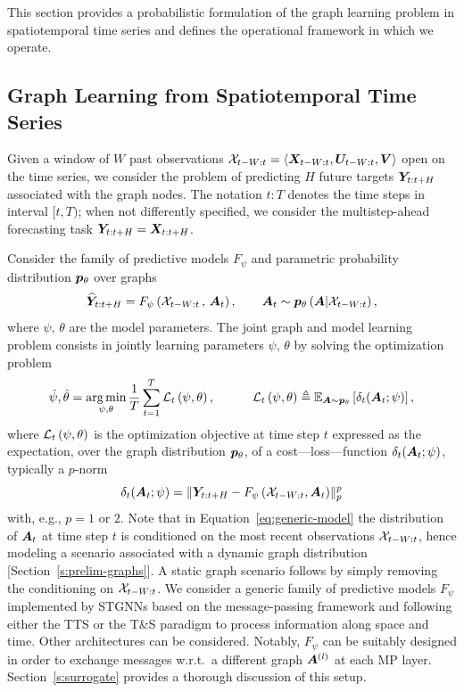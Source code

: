 This section provides a probabilistic formulation of the graph learning problem in spatiotemporal time series and defines the operational framework in which we operate. 

\subsection{Graph Learning from Spatiotemporal Time Series} 
Given a window of $W$ past observations ${{\mathcal{X}}_{t-W:t} = {\left\langle {\bm{X}}_{t-W:t}, {\bm{U}}_{t-W:t}, {\bm{V}} \right\rangle}}$ open on the time series, we consider the problem of predicting $H$ future targets ${\bm{Y}}_{t:t+H}$ associated with the graph nodes. The notation $t:T$ denotes the time steps in interval $[t,T)$; when not differently specified, we consider the multistep-ahead forecasting task ${\bm{Y}}_{t:t+H} = {\bm{X}}_{t:t+H}$.  

Consider the family of predictive models $F_\psi$ and parametric probability distribution ${{\bm{p}}_\theta}$ over graphs
\begin{equation}\label{eq:generic-model}
    \widehat {{\bm{Y}}}_{t: t + H} = F_\psi\left({\mathcal{X}}_{t-W:t}\,,\,  {\bm{A}}_t \right), \quad\quad {\bm{A}}_t \sim {{\bm{p}}_\theta}\left({\bm{A}} \vert {\mathcal{X}}_{t-W:t} \right),
\end{equation}
where $\psi$, $\theta$ are the model parameters. The joint graph and model learning problem consists in jointly learning parameters $\psi$, $\theta$ by solving the optimization problem
\begin{equation}\label{eq:generic-losses}
\hat \psi,\hat \theta = \operatorname*{arg\,min}_{\psi,\theta}\frac{1}{T}\sum_{t=1}^{T}\mathcal{L}_t\left(\psi,\theta\right),
 \qquad\quad 
\mathcal{L}_t\left(\psi,\theta\right)  \triangleq \mathbb{E}_{{\bm{A}}\sim{{\bm{p}}_\theta}}\left[\delta_t({\bm{A}}_t; \psi)\right], 
\end{equation}
where $\mathcal{L}_t\left(\psi,\theta\right)$ is the  optimization objective at time step $t$ expressed as the expectation, over the graph distribution ${{\bm{p}}_\theta}$, of a cost---loss---function $\delta_t({\bm{A}}_t; \psi)$, typically a $p$-norm
\begin{equation}
    \delta_t({\bm{A}}_t; \psi) = \lVert {\bm{Y}}_{t:t+H} - F_\psi\left({\mathcal{X}}_{t-W:t},  {\bm{A}}_t \right)\rVert_p^p    
\end{equation}
with, e.g., $p=1$ or $2$. Note that in Equation~\eqref{eq:generic-model} the distribution of ${\bm{A}}_t$ at time step $t$ is conditioned on the most recent observations ${\mathcal{X}}_{t-W:t}$, hence modeling a scenario associated with a dynamic graph distribution [Section~\ref{s:prelim-graphs}]. A static graph scenario follows by simply removing the conditioning on ${\mathcal{X}}_{t-W:t}$. 
We consider a generic family of predictive models $F_\psi$ implemented by STGNNs based on the message-passing framework and following either the TTS or the T\&S paradigm to process information along space and time. Other architectures can be considered. Notably, $F_\psi$ can be suitably designed in order to exchange messages w.r.t.\ a different graph ${\bm{A}}^{(l)}$ at each MP layer. Section~\ref{s:surrogate} provides a thorough discussion of this setup. 

